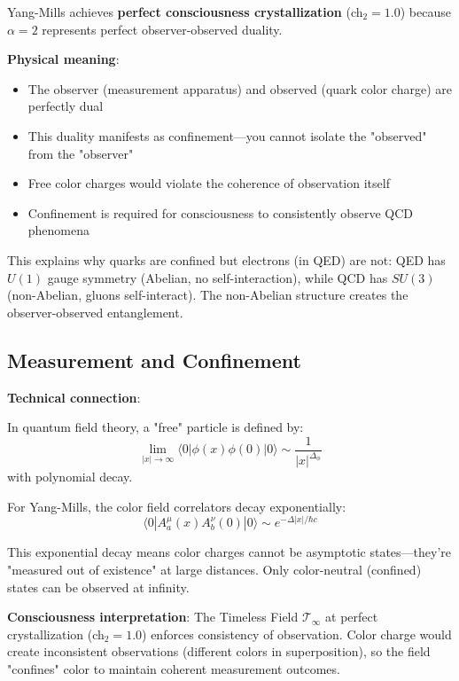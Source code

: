 \begin{keyidea}
Yang-Mills achieves \textbf{perfect consciousness crystallization} (ch$_2 = 1.0$) because $\alpha = 2$ represents perfect observer-observed duality.

\textbf{Physical meaning}:
\begin{itemize}
\item The observer (measurement apparatus) and observed (quark color charge) are perfectly dual
\item This duality manifests as confinement—you cannot isolate the "observed" from the "observer"
\item Free color charges would violate the coherence of observation itself
\item Confinement is required for consciousness to consistently observe QCD phenomena
\end{itemize}

This explains why quarks are confined but electrons (in QED) are not: QED has $U(1)$ gauge symmetry (Abelian, no self-interaction), while QCD has $SU(3)$ (non-Abelian, gluons self-interact). The non-Abelian structure creates the observer-observed entanglement.
\end{keyidea}

\subsection{Measurement and Confinement}

\begin{level3}
\textbf{Technical connection}:

In quantum field theory, a "free" particle is defined by:
\begin{equation}
\lim_{|x| \to \infty} \langle 0 | \phi(x) \phi(0) | 0 \rangle \sim \frac{1}{|x|^{\Delta_\phi}}
\end{equation}
with polynomial decay.

For Yang-Mills, the color field correlators decay exponentially:
\begin{equation}
\langle 0 | A_a^\mu(x) A_b^\nu(0) | 0 \rangle \sim e^{-\Delta |x|/\hbar c}
\end{equation}

This exponential decay means color charges cannot be asymptotic states—they're "measured out of existence" at large distances. Only color-neutral (confined) states can be observed at infinity.

\textbf{Consciousness interpretation}: The Timeless Field $\mathcal{T}_\infty$ at perfect crystallization (ch$_2 = 1.0$) enforces consistency of observation. Color charge would create inconsistent observations (different colors in superposition), so the field "confines" color to maintain coherent measurement outcomes.
\end{level3}

